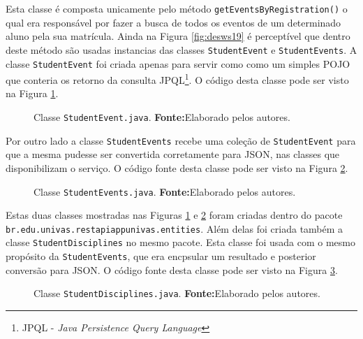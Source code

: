 	\par Esta classe é composta unicamente pelo método
\texttt{getEventsByRegistration()} o qual era responsável por fazer a busca de
todos os eventos de um determinado aluno pela sua matrícula. Ainda na Figura
\ref{fig:desws19} é perceptível que dentro deste método são usadas instancias
das classes \texttt{StudentEvent} e \texttt{StudentEvents}. A classe
\texttt{StudentEvent} foi criada apenas para servir como como um simples POJO
que conteria os retorno da consulta JPQL\footnote{JPQL - \textit{Java
Persistence Query Language}}. O código desta classe pode ser visto na Figura
\ref{fig:desws20}.
	
	\begin{figure}[h!]
		
		\caption[Classe StudentEvent.java]{Classe \texttt{StudentEvent.java}.
		\textbf{Fonte:}Elaborado pelos autores.}
		\label{fig:desws20}
	\end{figure}

	\pagebreak

	\par Por outro lado a classe \texttt{StudentEvents} recebe uma coleção de
\texttt{StudentEvent} para que a mesma pudesse ser convertida corretamente para
JSON, nas classes que disponibilizam o serviço. O código fonte desta classe pode
ser visto na Figura \ref{fig:desws21}.
	
	\begin{figure}[h!]
		
		\caption[Classe StudentEvents.java]{Classe \texttt{StudentEvents.java}.
		\textbf{Fonte:}Elaborado pelos autores.}
		\label{fig:desws21}
	\end{figure}
	
	\par Estas duas classes mostradas nas Figuras \ref{fig:desws20} e 
\ref{fig:desws21} foram criadas dentro do pacote\\ 
\texttt{br.edu.univas.restapiappunivas.entities}. Além delas foi criada também
a classe \texttt{StudentDisciplines} no mesmo pacote. Esta classe foi usada com
o mesmo propósito da \texttt{StudentEvents}, que era encpsular um resultado e
posterior conversão para JSON. O código fonte desta classe pode ser visto na
Figura \ref{fig:desws22}.

	\begin{figure}[h!]
		
		\caption[Classe StudentDisciplines.java]{Classe
		\texttt{StudentDisciplines.java}.
		\textbf{Fonte:}Elaborado pelos autores.}
		\label{fig:desws22}
	\end{figure}
	
